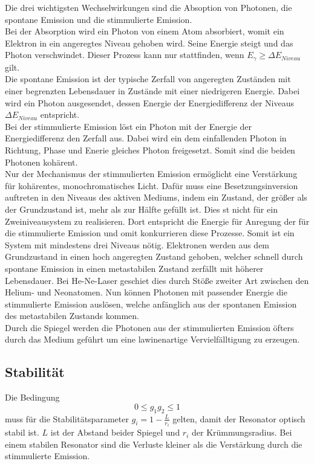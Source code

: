 Die drei wichtigsten Wechselwirkungen sind die Absoption von Photonen, die spontane Emission und die stimmulierte Emission.\\
Bei der Absorption wird ein Photon von einem Atom absorbiert, womit ein Elektron in ein angeregtes Niveau gehoben wird.
Seine Energie steigt und das Photon verschwindet.
Dieser Prozess kann nur stattfinden, wenn $E_\gamma \geq \Delta E_{Niveau}$ gilt.\\
Die spontane Emission ist der typische Zerfall von angeregten Zuständen mit einer begrenzten Lebensdauer in Zustände mit einer niedrigeren Energie.
Dabei wird ein Photon ausgesendet, dessen Energie der Energiedifferenz der Niveaus $\Delta E_{Niveau}$ entspricht.\\
Bei der stimmulierte Emission löst ein Photon mit der Energie der Energiedifferenz den Zerfall aus.
Dabei wird ein dem einfallenden Photon in Richtung, Phase und Enerie gleiches Photon freigesetzt.
Somit sind die beiden Photonen kohärent.\\
Nur der Mechanismus der stimmulierten Emission ermöglicht eine Verstärkung für kohärentes, monochromatisches Licht.
Dafür muss eine Besetzungsinversion auftreten in den Niveaus des aktiven Mediums, indem ein Zustand, der größer als der Grundzustand ist, mehr als zur Hälfte gefüllt ist.
Dies st nicht für ein Zweiniveausystem zu realisieren.
Dort entspricht die Energie für Anregung der für die stimmulierte Emission und omit konkurrieren diese Prozesse.
Somit ist ein System mit mindestens drei Niveaus nötig.
Elektronen werden aus dem Grundzustand in einen hoch angeregten Zustand gehoben, welcher schnell durch spontane Emission in einen metastabilen Zustand zerfällt mit höherer Lebensdauer.
Bei He-Ne-Laser geschiet dies durch Stöße zweiter Art zwischen den Helium- und Neonatomen.
Nun können Photonen mit passender Energie die stimmulierte Emission auslösen, welche anfänglich aus der spontanen Emission des metastabilen Zustands kommen.\\
Durch die Spiegel werden die Photonen aus der stimmulierten Emission öfters durch das Medium geführt um eine lawinenartige Vervielfälltigung zu erzeugen.

\subsection{Stabilität}

Die Bedingung
\begin{equation}
    0 \le g_1g_2 \le 1
    \label{eqn:stabi}
\end{equation}
muss für die Stabilitätsparameter $g_i =1-\frac{L}{r_i}$ gelten, damit der Resonator optisch stabil ist.
$L$ ist der Abstand beider Spiegel und $r_i$ der Krümmungsradius.
Bei einem stabilen Resonator sind die Verluste kleiner als die Verstärkung durch die stimmulierte Emission.

